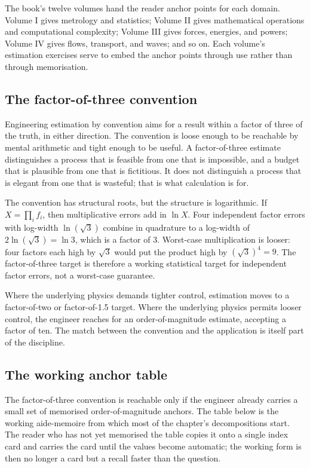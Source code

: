 The book's twelve volumes hand the reader anchor points for each domain.
Volume I gives metrology and statistics; Volume II gives mathematical
operations and computational complexity; Volume III gives forces,
energies, and powers; Volume IV gives flows, transport, and waves; and so
on. Each volume's estimation exercises serve to embed the anchor points
through use rather than through memorisation.

\subsection{The factor-of-three convention}

Engineering estimation by convention aims for a result within a factor
of three of the truth, in either direction. The convention is loose
enough to be reachable by mental arithmetic and tight enough to be
useful. A factor-of-three estimate distinguishes a process that is
feasible from one that is impossible, and a budget that is plausible
from one that is fictitious. It does not distinguish a process that is
elegant from one that is wasteful; that is what calculation is for.

The convention has structural roots, but the structure is logarithmic.
If $X = \prod_{i} f_{i}$, then multiplicative errors add in $\ln X$.
Four independent factor errors with log-width $\ln(\sqrt{3})$ combine in
quadrature to a log-width of $2\ln(\sqrt{3}) = \ln 3$, which is a factor
of $3$. Worst-case multiplication is looser: four factors each high by
$\sqrt{3}$ would put the product high by $(\sqrt{3})^{4} = 9$. The
factor-of-three target is therefore a working statistical target for
independent factor errors, not a worst-case guarantee.

Where the underlying physics demands tighter control, estimation moves
to a factor-of-two or factor-of-1.5 target. Where the underlying physics
permits looser control, the engineer reaches for an order-of-magnitude
estimate, accepting a factor of ten. The match between the convention
and the application is itself part of the discipline.

\subsection{The working anchor table}

The factor-of-three convention is reachable only if the engineer
already carries a small set of memorised order-of-magnitude
anchors. The table below is the working aide-memoire from which
most of the chapter's decompositions start. The reader who has
not yet memorised the table copies it onto a single index card
and carries the card until the values become automatic; the
working form is then no longer a card but a recall faster than
the question.

